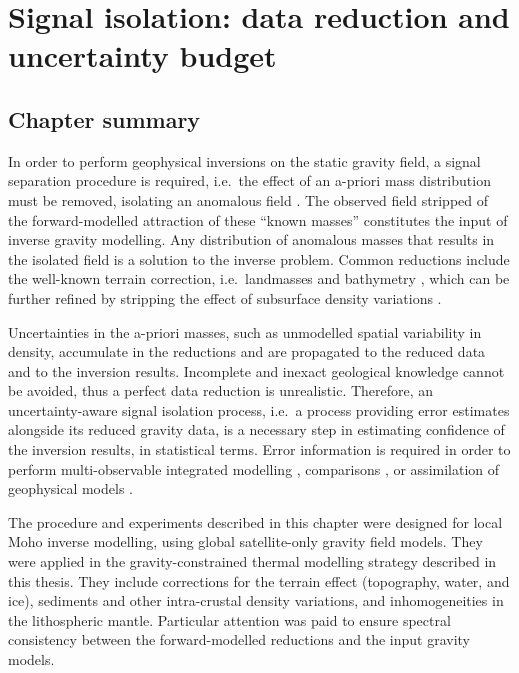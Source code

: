 \chapter{Signal isolation: data reduction and uncertainty budget}
\label{c:SigIs}

\section*{Chapter summary}
\label{s:SigIs:Summary}
In order to perform geophysical inversions on the static gravity field, a signal separation procedure is required, i.e.~the effect of an a-priori mass distribution must be removed, isolating an anomalous field \parencites[e.g.][]{Tenzer2009}{Tenzer2012refined}{Sjoberg2013}[][and references therein]{Aitken2015}.
The observed field stripped of the forward-modelled attraction of these ``known masses'' constitutes the input of inverse gravity modelling.
Any distribution of anomalous masses that results in the isolated field is a solution to the inverse problem.
Common reductions include the well-known terrain correction, i.e.~landmasses and bathymetry \parencites{Hinze2003}{Hinze2005}, which can be further refined by stripping the effect of subsurface density variations \parencite{Vajda2008}.

Uncertainties in the a-priori masses, such as unmodelled spatial variability in density, accumulate in the reductions and are propagated to the reduced data and to the inversion results.
Incomplete and inexact geological knowledge cannot be avoided, thus a perfect data reduction is unrealistic.
Therefore, an uncertainty-aware signal isolation process, i.e.~a process providing error estimates alongside its reduced gravity data, is a necessary step in estimating confidence of the inversion results, in statistical terms.
Error information is required in order to perform multi-observable integrated modelling \parencite[e.g.][]{Afonso2013}, comparisons \parencite[e.g.][]{Root2017}, or assimilation of geophysical models \parencites[e.g.~to assemble large scale maps from local studies, see][]{Tesauro2008}{Grad2009}{Molinari2011}.

The procedure and experiments described in this chapter were designed for local Moho inverse modelling, using global satellite-only gravity field models.
They were applied in the gravity-constrained thermal modelling strategy described in this thesis.
They include corrections for the terrain effect (topography, water, and ice), sediments and other intra-crustal density variations, and inhomogeneities in the lithospheric mantle.
Particular attention was paid to ensure spectral consistency between the forward-modelled reductions and the input gravity models.

